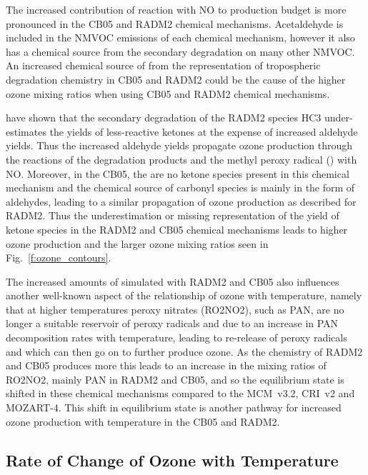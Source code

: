 The increased contribution of  reaction with NO to  production budget is more pronounced in the CB05 and RADM2 chemical mechanisms.
Acetaldehyde is included in the NMVOC emissions of each chemical mechanism, however it also has a chemical source from the secondary degradation on many other NMVOC.
An increased chemical source of  from the representation of tropospheric degradation chemistry in CB05 and RADM2 could be the cause of the higher ozone mixing ratios when using CB05 and RADM2 chemical mechanisms.

\citet{Coates:2015} have shown that the secondary degradation of the RADM2 species HC3 under-estimates the yields of less-reactive ketones at the expense of increased aldehyde yields.
Thus the increased aldehyde yields propagate ozone production through the reactions of the degradation products  and the methyl peroxy radical () with NO.
Moreover, in the CB05, the are no ketone species present in this chemical mechanism and the chemical source of carbonyl species is mainly in the form of aldehydes, leading to a similar propagation of ozone production as described for RADM2.
Thus the underestimation or missing representation of the yield of ketone species in the RADM2 and CB05 chemical mechanisms leads to higher ozone production and the larger ozone mixing ratios seen in Fig.~\ref{f:ozone_contours}.

The increased amounts of  simulated with RADM2 and CB05 also influences another well-known aspect of the relationship of ozone with temperature, namely that at higher temperatures peroxy nitrates (RO2NO2), such as PAN, are no longer a suitable reservoir of peroxy radicals and  due to an increase in PAN decomposition rates with temperature, leading to re-release of peroxy radicals and  which can then go on to further produce ozone.
As the chemistry of RADM2 and CB05 produces more  this leads to an increase in the  mixing ratios of RO2NO2, mainly PAN in RADM2 and CB05, and so the equilibrium state is shifted in these chemical mechanisms compared to the MCM~v3.2, CRI~v2 and MOZART-4.
This shift in equilibrium state is another pathway for increased ozone production with temperature in the CB05 and RADM2.

\subsection{Rate of Change of Ozone with Temperature} \label{d:m_O3-T}
